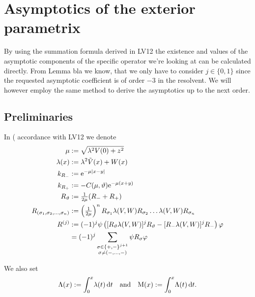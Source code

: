 \section{Asymptotics of the exterior parametrix}
By using the summation formula derived in LV12 the existence and values of the
asymptotic components of the specific operator we're looking at can be
calculated directly. From Lemma bla we know, that we only have to consider $j\in
\{0, 1\}$ since the requested asymptotic coefficient is of order $-3$ in the
resolvent. We will however employ the same method to derive the asymptotics up
to the next order.

\subsection{Preliminaries}
In (%
accordance with LV12 we denote
\begin{align*}
    \mu &:= \sqrt{\lambda^2 V(0) + z^2} \\
    \lambda(x) &:= \lambda^2 \tilde V(x) + W(x) \\
       k_{R_-} &:= \Eto{-\mu\Abs{x-y}} \\
    k_{R_+} &:= -C(\mu,\theta)\Eto{-\mu(x+y)} \\
    R_\theta &:= \tfrac1{2\mu} (R_- + R_+) \\
    R_{(\sigma_1,\sigma_2,\ldots,\sigma_n)} &:= 
    \left(\tfrac1{2\mu}\right)^n R_{\sigma_1} \lambda(V,W) R_{\sigma_2} \dots
    \lambda(V,W) R_{\sigma_n} \\
    R^{(j)} &:= (-1)^j \psi \left( [R_\theta \lambda(V,W)]^j R_\theta -
    [R_-\lambda(V,W)]^j R_-\right) \phi \\
            &= (-1)^j
                \sum_{
                        \substack{
                          \sigma\in\{+,-\}^{j+1} \\
                         \sigma\neq(-,\ldots,-)
                         }
                        }
                     \psi R_\sigma
                \phi
\end{align*}

We also set
\begin{align}
    \Lambda(x) := \Integ[x]{0}{t}{\lambda(t)}\quad\text{and}\quad
    \mathrm M(x) := \Integ[x]{0}{t}{\Lambda(t)}.
\end{align}

